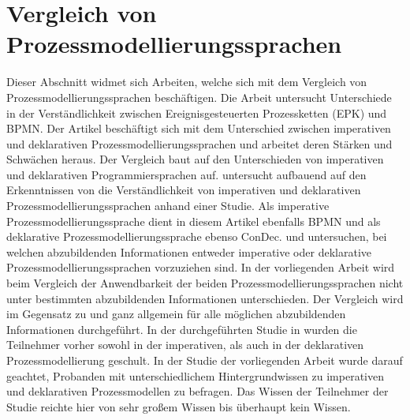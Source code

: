 \section{Vergleich von Prozessmodellierungssprachen}

Dieser Abschnitt widmet sich Arbeiten, welche sich mit dem Vergleich von Prozessmodellierungssprachen beschäftigen.\newline
Die Arbeit \cite{recker2007does} untersucht Unterschiede in der Verständlichkeit zwischen Ereignisgesteuerten Prozessketten (EPK) und BPMN.\newline
Der Artikel \cite{fahland2010} beschäftigt sich mit dem Unterschied zwischen imperativen und deklarativen Prozessmodellierungssprachen und arbeitet deren Stärken und Schwächen heraus. Der Vergleich baut auf den Unterschieden von imperativen und deklarativen Programmiersprachen auf. \newline
\cite{pichler2012} untersucht aufbauend auf den Erkenntnissen von  \cite{fahland2010} die Verständlichkeit von imperativen und deklarativen Prozessmodellierungssprachen anhand einer Studie. Als imperative Prozessmodellierungssprache dient in diesem Artikel ebenfalls BPMN und als deklarative Prozessmodellierungssprache ebenso ConDec. \newline 
\cite{fahland2010} und \cite{pichler2012} untersuchen, bei welchen abzubildenden Informationen entweder imperative oder deklarative Prozessmodellierungssprachen vorzuziehen sind. In der vorliegenden Arbeit wird beim Vergleich der Anwendbarkeit der beiden Prozessmodellierungssprachen nicht unter bestimmten abzubildenden Informationen unterschieden. Der Vergleich wird im Gegensatz zu \cite{fahland2010} und \cite{pichler2012}  ganz allgemein für alle möglichen abzubildenden Informationen durchgeführt. \newline
In der durchgeführten Studie in \cite{pichler2012} wurden die Teilnehmer vorher sowohl in der imperativen, als auch in der deklarativen Prozessmodellierung geschult. In der Studie der vorliegenden Arbeit wurde darauf geachtet, Probanden mit unterschiedlichem Hintergrundwissen zu imperativen und deklarativen Prozessmodellen zu befragen. Das Wissen der Teilnehmer der Studie reichte hier von sehr großem Wissen bis überhaupt kein Wissen.\newline


